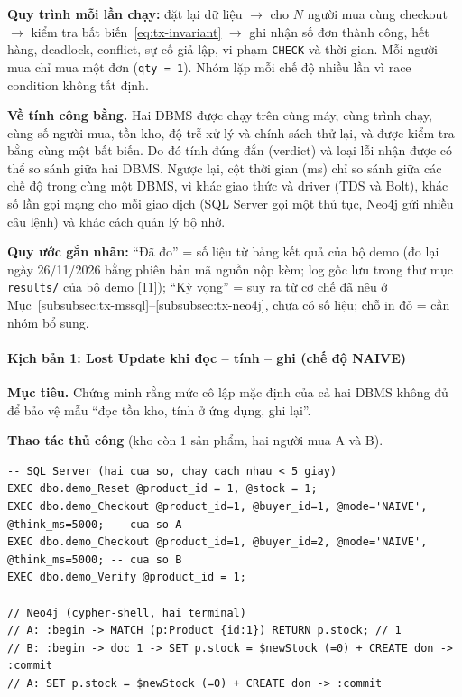 \textbf{Quy trình mỗi lần chạy:} đặt lại dữ liệu $\rightarrow$ cho $N$ người mua cùng checkout $\rightarrow$ kiểm tra bất biến~\eqref{eq:tx-invariant} $\rightarrow$ ghi nhận số đơn thành công, hết hàng, deadlock, conflict, sự cố giả lập, vi phạm \texttt{CHECK} và thời gian. Mỗi người mua chỉ mua một đơn (\texttt{qty = 1}). Nhóm lặp mỗi chế độ nhiều lần vì race condition không tất định.

\textbf{Về tính công bằng.} Hai DBMS được chạy trên cùng máy, cùng trình chạy, cùng số người mua, tồn kho, độ trễ xử lý và chính sách thử lại, và được kiểm tra bằng cùng một bất biến. Do đó tính đúng đắn (verdict) và loại lỗi nhận được có thể so sánh giữa hai DBMS. Ngược lại, cột thời gian (ms) chỉ so sánh giữa các chế độ trong cùng một DBMS, vì khác giao thức và driver (TDS và Bolt), khác số lần gọi mạng cho mỗi giao dịch (SQL Server gọi một thủ tục, Neo4j gửi nhiều câu lệnh) và khác cách quản lý bộ nhớ.

\textbf{Quy ước gắn nhãn:} ``Đã đo'' = số liệu từ bảng kết quả của bộ demo (đo lại ngày 26/11/2026 bằng phiên bản mã nguồn nộp kèm; log gốc lưu trong thư mục \texttt{results/} của bộ demo [11]); ``Kỳ vọng'' = suy ra từ cơ chế đã nêu ở Mục~\ref{subsubsec:tx-mssql}--\ref{subsubsec:tx-neo4j}, chưa có số liệu; chỗ in đỏ = cần nhóm bổ sung.

\paragraph{Kịch bản 1: Lost Update khi đọc -- tính -- ghi (chế độ NAIVE)}
\label{par:tx-kb1}\mbox{}

\textbf{Mục tiêu.} Chứng minh rằng mức cô lập mặc định của cả hai DBMS không đủ để bảo vệ mẫu ``đọc tồn kho, tính ở ứng dụng, ghi lại''.

\textbf{Thao tác thủ công} (kho còn 1 sản phẩm, hai người mua A và B).
\begin{lstlisting}[basicstyle=\ttfamily\small, breaklines=true, frame=single]
-- SQL Server (hai cua so, chay cach nhau < 5 giay)
EXEC dbo.demo_Reset @product_id = 1, @stock = 1;
EXEC dbo.demo_Checkout @product_id=1, @buyer_id=1, @mode='NAIVE', @think_ms=5000; -- cua so A
EXEC dbo.demo_Checkout @product_id=1, @buyer_id=2, @mode='NAIVE', @think_ms=5000; -- cua so B
EXEC dbo.demo_Verify @product_id = 1;

// Neo4j (cypher-shell, hai terminal)
// A: :begin -> MATCH (p:Product {id:1}) RETURN p.stock; // 1
// B: :begin -> doc 1 -> SET p.stock = $newStock (=0) + CREATE don -> :commit
// A: SET p.stock = $newStock (=0) + CREATE don -> :commit
\end{lstlisting}


